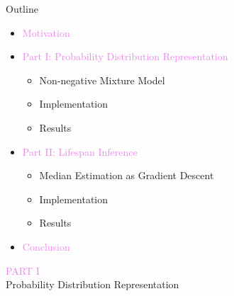 \documentclass[aspectratio=169]{beamer}
\begin{document}
\begin{frame}{Outline}
	\begin{itemize}
		\setlength{\itemsep}{0.5em}
		\item {\textcolor{violet}{Motivation}}
		\item {\textcolor{violet}{Part I: Probability Distribution Representation}}\\[0.25em]
		\begin{itemize}
			\setlength{\itemsep}{0.25em}
			\item Non-negative Mixture Model
			\item Implementation
			\item Results
		\end{itemize}
		\item {\textcolor{violet}{Part II: Lifespan Inference}}\\[0.25em]
		\begin{itemize}
			\setlength{\itemsep}{0.25em}
			\item Median Estimation as Gradient Descent
			\item Implementation
			\item Results
		\end{itemize}
		\item {\textcolor{violet}{Conclusion}}
	\end{itemize}
\end{frame}

\begin{frame}
	\centering
	{\Large\textcolor{violet}{\textsc{PART I}}}\\
	\huge Probability Distribution Representation
\end{frame}

\end{document}
